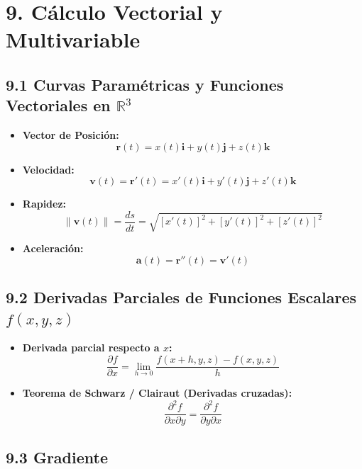 \documentclass[11pt,a4paper]{article}
\begin{document}
\section*{9. Cálculo Vectorial y Multivariable}

\subsection*{9.1 Curvas Paramétricas y Funciones Vectoriales en $\mathbb{R}^3$}

\begin{itemize}
  \item \textbf{Vector de Posición:}
  \[
    \mathbf{r}(t) = x(t)\mathbf{i} + y(t)\mathbf{j} + z(t)\mathbf{k}
  \]
  \item \textbf{Velocidad:}
  \[
    \mathbf{v}(t) = \mathbf{r}'(t) = x'(t)\mathbf{i} + y'(t)\mathbf{j} + z'(t)\mathbf{k}
  \]
  \item \textbf{Rapidez:}
  \[
    \|\mathbf{v}(t)\| = \frac{ds}{dt} = \sqrt{[x'(t)]^2 + [y'(t)]^2 + [z'(t)]^2}
  \]
  \item \textbf{Aceleración:}
  \[
    \mathbf{a}(t) = \mathbf{r}''(t) = \mathbf{v}'(t)
  \]
\end{itemize}

\subsection*{9.2 Derivadas Parciales de Funciones Escalares $f(x, y, z)$}

\begin{itemize}
  \item \textbf{Derivada parcial respecto a $x$:}
  \[
    \frac{\partial f}{\partial x} = \lim_{h \to 0} \frac{f(x + h, y, z) - f(x, y, z)}{h}
  \]
  \item \textbf{Teorema de Schwarz / Clairaut (Derivadas cruzadas):}
  \[
    \frac{\partial^2 f}{\partial x \partial y} = \frac{\partial^2 f}{\partial y \partial x}
  \]
\end{itemize}

\subsection*{9.3 Gradiente}
\end{document}

